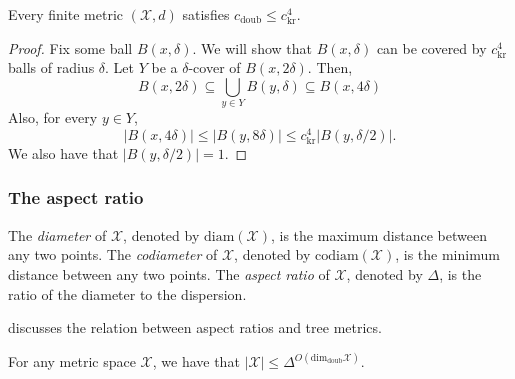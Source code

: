 \documentclass[../main.tex]{subfiles}
\newcommand{\set}[1]{\mathcal {#1}}
\newcommand{\diam}[1]{\text{diam}({#1})}
\newcommand{\codiam}[1]{\text{codiam}({#1})}
\newcommand{\aspect}[1]{\Delta}
\newcommand{\krdim}{\text{dim}_\text{kr}}
\newcommand{\doubdim}{\text{dim}_\text{doub}}
\newcommand{\krnum}{c_\text{kr}}
\newcommand{\doubnum}{c_\text{doub}}
\begin{document}
\begin{lemma}
    Every finite metric $(\set X,d)$ satisfies
    $\doubnum \le \krnum^4$.
\end{lemma}
\begin{proof}
    Fix some ball $B(x,\delta)$.
    We will show that $B(x,\delta)$ can be covered by $\krnum^4$ balls of radius $\delta$.
    Let $Y$ be a $\delta$-cover of $B(x,2\delta)$.
    Then,
    \begin{equation}
        B(x,2\delta) 
        \subseteq 
        \bigcup\limits_{y\in Y} B(y,\delta) 
        \subseteq
        B(x,4\delta)
    \end{equation}
    Also, for every $y\in Y$,
    \begin{equation}
        |B(x,4\delta)| 
        \le 
        |B(y,8\delta)| 
        \le 
        \krnum^4 |B(y,\delta/2)|
        .
    \end{equation}
    We also have that $|B(y,\delta/2)|=1$.
\end{proof}


\subsubsection{The aspect ratio}

The \emph{diameter} of $\set X$, denoted by $\diam{\set X}$, is the maximum distance between any two points.
The \emph{codiameter} of $\set X$, denoted by $\codiam{\set X}$, is the minimum distance between any two points.
The \emph{aspect ratio} of $\set X$, denoted by $\aspect{\set X}$, is the ratio of the diameter to the dispersion.

\cite{bartal2003metric} discusses the relation between aspect ratios and tree metrics.

\begin{lemma}
    For any metric space $\set X$, we have that
    $
        |\set X| \le \aspect{\set X}^{O(\doubdim{\set X})}.
    $
\end{lemma}
\end{document}
